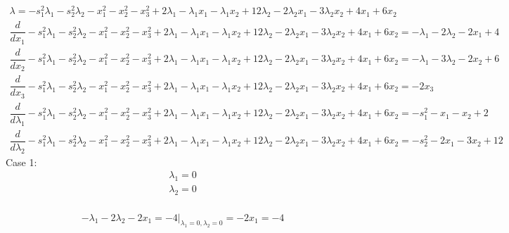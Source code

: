 \documentclass{article}
\begin{document}
\begin{align*}
\lambda=-s_{1}^{2}\lambda_{1} - s_{2}^{2}\lambda_{2} - x_{1}^{2} - x_{2}^{2} - x_{3}^{2} + 2\lambda_{1} - \lambda_{1}x_{1} - \lambda_{1}x_{2} + 12\lambda_{2} - 2\lambda_{2}x_{1} - 3\lambda_{2}x_{2} + 4x_{1} + 6x_{2}\end{align*}
\begin{align*}
\dfrac{d}{dx_{1}}-s_{1}^{2}\lambda_{1} - s_{2}^{2}\lambda_{2} - x_{1}^{2} - x_{2}^{2} - x_{3}^{2} + 2\lambda_{1} - \lambda_{1}x_{1} - \lambda_{1}x_{2} + 12\lambda_{2} - 2\lambda_{2}x_{1} - 3\lambda_{2}x_{2} + 4x_{1} + 6x_{2}=-\lambda_{1} - 2\lambda_{2} - 2x_{1} + 4\end{align*}
\begin{align*}
\dfrac{d}{dx_{2}}-s_{1}^{2}\lambda_{1} - s_{2}^{2}\lambda_{2} - x_{1}^{2} - x_{2}^{2} - x_{3}^{2} + 2\lambda_{1} - \lambda_{1}x_{1} - \lambda_{1}x_{2} + 12\lambda_{2} - 2\lambda_{2}x_{1} - 3\lambda_{2}x_{2} + 4x_{1} + 6x_{2}=-\lambda_{1} - 3\lambda_{2} - 2x_{2} + 6\end{align*}
\begin{align*}
\dfrac{d}{dx_{3}}-s_{1}^{2}\lambda_{1} - s_{2}^{2}\lambda_{2} - x_{1}^{2} - x_{2}^{2} - x_{3}^{2} + 2\lambda_{1} - \lambda_{1}x_{1} - \lambda_{1}x_{2} + 12\lambda_{2} - 2\lambda_{2}x_{1} - 3\lambda_{2}x_{2} + 4x_{1} + 6x_{2}=-2x_{3}\end{align*}
\begin{align*}
\dfrac{d}{d\lambda_{1}}-s_{1}^{2}\lambda_{1} - s_{2}^{2}\lambda_{2} - x_{1}^{2} - x_{2}^{2} - x_{3}^{2} + 2\lambda_{1} - \lambda_{1}x_{1} - \lambda_{1}x_{2} + 12\lambda_{2} - 2\lambda_{2}x_{1} - 3\lambda_{2}x_{2} + 4x_{1} + 6x_{2}=-s_{1}^{2} - x_{1} - x_{2} + 2\end{align*}
\begin{align*}
\dfrac{d}{d\lambda_{2}}-s_{1}^{2}\lambda_{1} - s_{2}^{2}\lambda_{2} - x_{1}^{2} - x_{2}^{2} - x_{3}^{2} + 2\lambda_{1} - \lambda_{1}x_{1} - \lambda_{1}x_{2} + 12\lambda_{2} - 2\lambda_{2}x_{1} - 3\lambda_{2}x_{2} + 4x_{1} + 6x_{2}=-s_{2}^{2} - 2x_{1} - 3x_{2} + 12\end{align*}
Case 1: \begin{align*}
\lambda_{1}=0\end{align*}
 \begin{align*}
\lambda_{2}=0\end{align*}
 \\
\begin{align*}
\left.-\lambda_{1} - 2\lambda_{2} - 2x_{1}=-4\right|_{\lambda_{1}=0,\lambda_{2}=0}=-2x_{1}=-4\end{align*}
\end{document}

